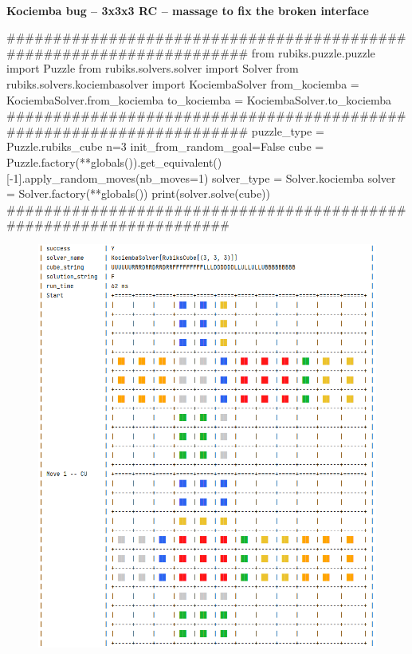 \afblue
\paragraph{}{\textbf{Kociemba bug -- 3x3x3 \textbf{RC} --  massage to fix the broken interface}}
\begin{python}
#####################################################################
from rubiks.puzzle.puzzle import Puzzle
from rubiks.solvers.solver import Solver
from rubiks.solvers.kociembasolver import KociembaSolver
from_kociemba = KociembaSolver.from_kociemba
to_kociemba = KociembaSolver.to_kociemba
#####################################################################
puzzle_type = Puzzle.rubiks_cube
n=3
init_from_random_goal=False
cube = Puzzle.factory(**globals()).get_equivalent()[-1].apply_random_moves(nb_moves=1)
solver_type = Solver.kociemba
solver = Solver.factory(**globals())
print(solver.solve(cube))
###################################################################
\end{python}
\black

\begin{figure}[H]
\centering
\includegraphics[scale=0.5]{./Figures/KociembaBug333Fix1}
\label{fig:KociembaBug333Fix1}
\end{figure}

